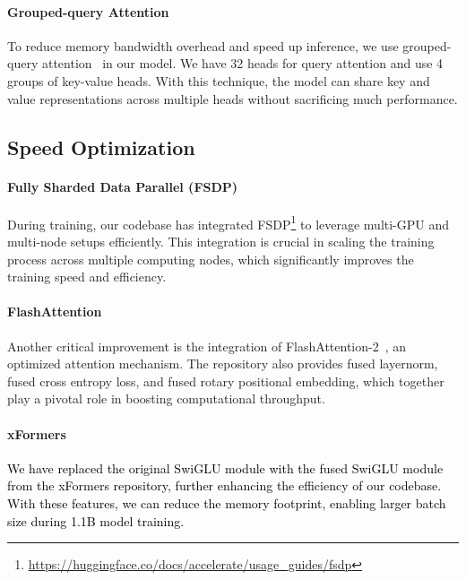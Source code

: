 \documentclass{article}
\begin{document}
\paragraph{Grouped-query Attention}
To reduce memory bandwidth overhead and speed up inference, we use grouped-query attention~\citep{DBLP:journals/corr/abs-2305-13245} in our model.
We have 32 heads for query attention and use 4 groups of key-value heads.
With this technique, the model can share key and value representations across multiple heads without sacrificing much performance.
\vspace{-1em}
\subsection{Speed Optimization}
\vspace{-0.5em}
\paragraph{Fully Sharded Data Parallel (FSDP)}
During training, our codebase has integrated FSDP\footnote{\url{https://huggingface.co/docs/accelerate/usage_guides/fsdp}} to leverage multi-GPU and multi-node setups efficiently. This integration is crucial in scaling the training process across multiple computing nodes, which significantly improves the training speed and efficiency.
\vspace{-1em}
\paragraph{FlashAttention}
Another critical improvement is the integration of FlashAttention-2~\citep{dao2023fa2}, an optimized attention mechanism.
The repository also provides fused layernorm, fused cross entropy loss, and fused rotary positional embedding, which together play a pivotal role in boosting computational throughput.
\vspace{-1em}
\paragraph{xFormers}
\textcolor{black}{
We have replaced the original SwiGLU module with the fused SwiGLU module from the xFormers \citep{xFormers2022} repository, further enhancing the efficiency of our codebase.
With these features, we can reduce the memory footprint, enabling larger batch size during 1.1B model training.
}
\begin{table}
  \vspace{-12pt}
  \centering
  \caption{
     Comparison of our training speed with Pythia-1.0B and MPT-1.3B.
  }
  \label{tab:comparison}
  \vspace{-10pt}
\end{table}
\vspace{-1em}
\end{document}

